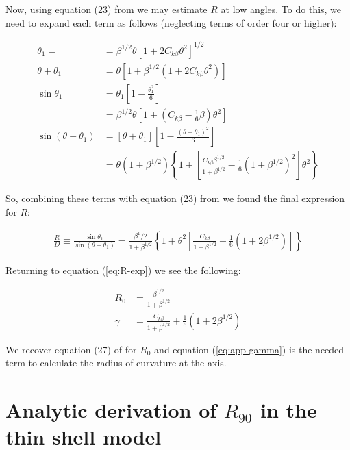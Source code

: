 Now, using equation (23) from \CRW{} we may estimate $R$ at low angles. To do this, we need to
expand each term as follows (neglecting terms of order four or higher):

\begin{align}
\theta_1 = &= \beta^{1/2}\theta\left[1+ 2C_{k\beta}\theta^2\right]^{1/2} \\
\theta + \theta_1 &= \theta\left[1+\beta^{1/2}\left(1+2C_{k\beta}\theta^2\right)\right]\\
\sin\theta_1 &= \theta_1\left[1-\frac{\theta_1^2}{6}\right] \\
 &= \beta^{1/2}\theta\left[1+\left(C_{k\beta}-\frac{1}{6}\beta\right)\theta^2\right] \\
 \sin(\theta+\theta_1) &= \left[\theta+\theta_1\right]\left[1-\frac{\left(\theta+\theta_1
 \right)^2}{6}\right] \\
 &= \theta\left(1+\beta^{1/2}\right)\left\lbrace 1+\left[\frac{C_{k\beta}\beta^{1/2}}
 {1+\beta^{1/2}}-\frac{1}{6}\left(1+\beta^{1/2}\right)^2\right]\theta^2\right\rbrace
\end{align}


So, combining these terms with equation (23) from \CRW{} we found the final expression for $R$:

\begin{align}
\frac{R}{D}\equiv \frac{\sin\theta_1}{\sin(\theta+\theta_1)} = \frac{\beta^1/2}{1+\beta^{1/2}}
\left\lbrace 1 + \theta^2\left[\frac{C_{k\beta}}{1+\beta^{1/2}}+\frac{1}{6}\left(1+2\beta^{1/2}
\right)\right] \right\rbrace \label{eq:r-small-theta}
\end{align}

Returning to equation (\ref{eq:R-exp}) we see the following:

\begin{align}
R_0 &= \frac{\beta^{1/2}}{1+\beta^{1/2}} \\
\gamma &= \frac{C_{k\beta}}{1+\beta^{1/2}}+\frac{1}{6}\left(1+2\beta^{1/2}\right)
\label{eq:app-gamma}
\end{align}

We recover equation (27) of \CRW{} for $R_0$ and equation (\ref{eq:app-gamma}) is the
needed term to calculate the radius of curvature at the axis.

\section{Analytic derivation of \texorpdfstring{\boldmath $R_{90}$}{R\_90} in the thin shell model}
\label{app:r90-analytic}

